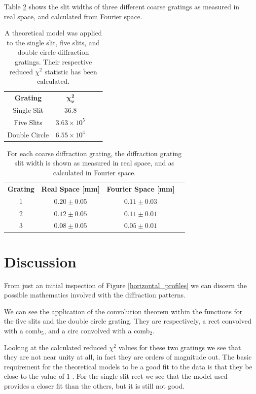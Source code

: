 \documentclass[twocolumn]{revtex4}
\begin{document}
Table \ref{realtofourier} shows the slit widths of three different coarse gratings as measured in real space, and calculated from Fourier space.
\begin{table}[h!]
\centering
\begin{tabular}{c@{\hskip 20pt}c@{\hskip 20pt}c@{\hskip 20pt}c} 
 \hline
 \textbf{Grating} & $\boldsymbol{\chi_\nu^2}$ \\ [0.5ex] 
 Single Slit &$36.8$ \\ 
 Five Slits & $3.63\times10^{5}$ \\
 Double Circle & $6.55\times10^{4}$ \\
 \hline
\end{tabular}
\caption{A theoretical model was applied to the single slit, five slits, and double circle diffraction gratings. Their respective reduced $\chi^2$ statistic has been calculated.}
\label{theoretical_model_applying}
\end{table}
\begin{table}[h!]
\centering
\begin{tabular}{c@{\hskip 15pt}c@{\hskip 15pt}c@{\hskip 10pt}c} 
 \hline
 \textbf{Grating} & \textbf{Real Space [mm]} & \textbf{Fourier Space [mm]} \\ [0.5ex] 
 $1$ &$0.20\pm0.05$ & $0.11\pm0.03$ \\ 
 $2$ & $0.12\pm0.05$ & $0.11\pm0.01$ \\
 $3$ & $0.08\pm0.05$ & $0.05\pm0.01$ \\
 \hline
\end{tabular}
\caption{For each coarse diffraction grating, the diffraction grating slit width is shown as measured in real space, and as calculated in Fourier space.}
\label{realtofourier}
\end{table}

\vspace{-3ex}
\section{Discussion}
\vspace{-2ex}
From just an initial inspection of Figure \ref{horizontal_profiles} we can discern the possible mathematics involved with the diffraction patterns.

We can see the application of the convolution theorem within the functions for the five slits and the double circle grating. They are respectively, a rect convolved with a comb$_5$, and a circ convolved with a comb$_2$. 

Looking at the calculated reduced $\chi^2$ values for these two gratings we see that they are not near unity at all, in fact they are orders of magnitude out. The basic requirement for the theoretical models to be a good fit to the data  is that they be close to the value of $1$ \cite{hughesandhayes}. For the single slit rect we see that the model used provides a closer fit than the others, but it is still not good.
\end{document}

